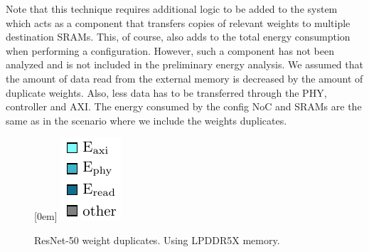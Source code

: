 Note that this technique requires additional logic to be added to the system which acts as a component that transfers copies of relevant weights to multiple destination SRAMs.
This, of course, also adds to the total energy consumption when performing a configuration.
However, such a component has not been analyzed and is not included in the preliminary energy analysis. 
We assumed that the amount of data read from the external memory is decreased by the amount of duplicate weights.
Also, less data has to be transferred through the PHY, controller and AXI.
The energy consumed by the config NoC and SRAMs are the same as in the scenario where we include the weights duplicates.

\begin{figure}[hbtp]
    \centering
    \hfill
    \subcaptionbox*{}[0em]{
        \includegraphics{assets/legend.pdf}
    }
    \hfill
    \caption{ResNet-50 weight duplicates. Using LPDDR5X memory.}
    \label{fig:resnet50_weight_duplicates}
\end{figure}